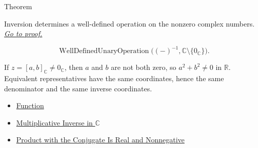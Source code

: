 \begin{theorembox}{Theorem}
\begin{theorem}
\label{thm:inversion-on-c-well-defined}
Inversion determines a well-defined operation on the nonzero complex numbers.
\hyperref[prf:inversion-on-c-well-defined]{\textit{Go to proof.}}
\end{theorem}
\end{theorembox}

\begin{remark*}
\[
\operatorname{WellDefinedUnaryOperation}
\bigl((-)^{-1},\mathbb{C}\setminus\{0_{\mathbb{C}}\}\bigr).
\]
\end{remark*}

\begin{remark*}[Interpretation]
If \(z=[a,b]_{\mathbb{C}}\ne0_{\mathbb{C}}\), then \(a\) and \(b\) are not
both zero, so \(a^2+b^2\ne0\) in \(\mathbb{R}\). Equivalent representatives
have the same coordinates, hence the same denominator and the same inverse
coordinates.
\end{remark*}

\begin{dependencies}
\begin{itemize}
  \item \hyperref[def:function]{Function}
  \item \hyperref[def:multiplicative-inverse-on-c]{Multiplicative Inverse in $\mathbb{C}$}
  \item \hyperref[lem:complex-product-with-conjugate]{Product with the Conjugate Is Real and Nonnegative}
\end{itemize}
\end{dependencies}
